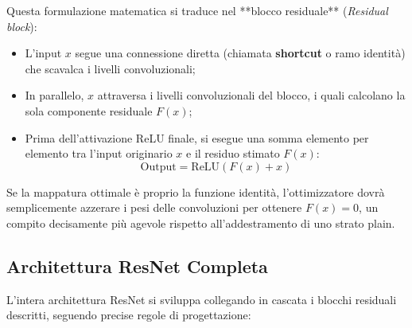 ﻿\documentclass[11pt, a4paper]{article}
\begin{document}

Questa formulazione matematica si traduce nel **blocco residuale** (\emph{Residual block}):
\begin{itemize}
    \item L'input $x$ segue una connessione diretta (chiamata \textbf{shortcut} o ramo identità) che scavalca i livelli convoluzionali;
    \item In parallelo, $x$ attraversa i livelli convoluzionali del blocco, i quali calcolano la sola componente residuale $F(x)$;
    \item Prima dell'attivazione ReLU finale, si esegue una somma elemento per elemento tra l'input originario $x$ e il residuo stimato $F(x)$:
    \[ \text{Output} = \text{ReLU}(F(x) + x) \]
\end{itemize}
Se la mappatura ottimale è proprio la funzione identità, l'ottimizzatore dovrà semplicemente azzerare i pesi delle convoluzioni per ottenere $F(x) = 0$, un compito decisamente più agevole rispetto all'addestramento di uno strato plain.


\subsection{Architettura ResNet Completa}

L'intera architettura ResNet si sviluppa collegando in cascata i blocchi residuali descritti, seguendo precise regole di progettazione:
\end{document}
